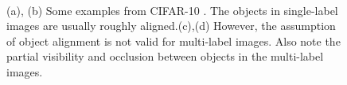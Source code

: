 \documentclass[journal]{IEEEtran}
\begin{document}
\begin{figure} 
    \centering
    \hfill
    \\
    \hfill
  \caption{(a), (b) Some examples from CIFAR-10 \cite{4}. The objects in     
        single-label images are usually roughly aligned.(c),(d) However, the 
        assumption of object alignment is not valid for multi-label
        images. Also note the partial visibility and occlusion
        between objects in the multi-label images.}
  \label{fig1} 
\end{figure}
\end{document}
